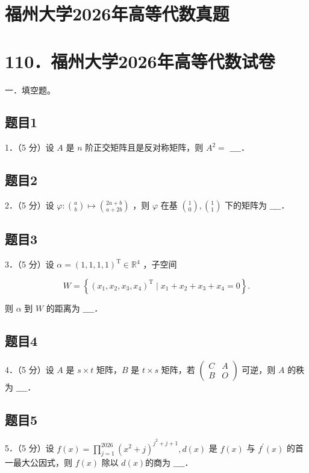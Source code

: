 \documentclass{article}
\begin{document}
\section*{福州大学2026年高等代数真题}
\section*{110．福州大学2026年高等代数试卷}
一．填空题。\\

\subsection{题目1}
1．（5 分）设 \(A\) 是 \(n\) 阶正交矩阵且是反对称矩阵，则 \(A^{2}=\) \(\_\_\_\_\)．

\subsection{题目2}
2．（5 分）设 \(\varphi:\binom{a}{b} \mapsto\binom{2 a+b}{a+2 b}\) ，则 \(\varphi\) 在基 \(\binom{1}{0},\binom{1}{1}\) 下的矩阵为 \(\_\_\_\_\)．

\subsection{题目3}
3．（5 分）设 \(\alpha=(1,1,1,1)^{\mathrm{T}} \in \mathbb{R}^{4}\) ，子空间

\[
W=\left\{\left(x_{1}, x_{2}, x_{3}, x_{4}\right)^{\mathrm{T}} \mid x_{1}+x_{2}+x_{3}+x_{4}=0\right\} .
\]

则 \(\alpha\) 到 \(W\) 的距离为 \(\_\_\_\_\)．

\subsection{题目4}
4．（5 分）设 \(A\) 是 \(s \times t\) 矩阵，\(B\) 是 \(t \times s\) 矩阵，若 \(\left(\begin{array}{cc}C & A \\ B & O\end{array}\right)\) 可逆，则 \(A\) 的秩为 \(\_\_\_\_\)．

\subsection{题目5}
5．（5 分）设 \(f(x)=\prod_{j=1}^{2026}\left(x^{2}+j\right)^{j^{2}+j+1}, d(x)\) 是 \(f(x)\) 与 \(f^{\prime}(x)\) 的首一最大公因式，则 \(f(x)\) 除以 \(d(x)\)的商为 \(\_\_\_\_\)．
\end{document}
